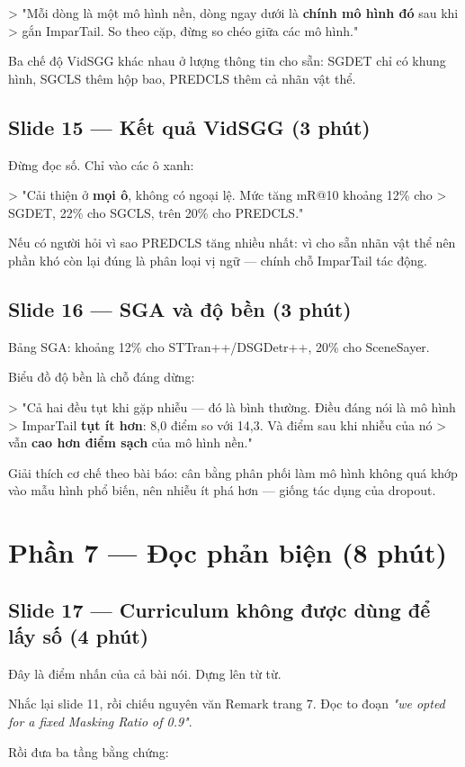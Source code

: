 \documentclass[11pt,a4paper]{article}
\begin{document}
> "Mỗi dòng là một mô hình nền, dòng ngay dưới là \textbf{chính mô hình đó} sau khi > gắn ImparTail. So theo cặp, đừng so chéo giữa các mô hình."

Ba chế độ VidSGG khác nhau ở lượng thông tin cho sẵn: SGDET chỉ có khung hình, SGCLS thêm hộp bao, PREDCLS thêm cả nhãn vật thể.

\subsection{Slide 15 --- Kết quả VidSGG (3 phút)}
Đừng đọc số. Chỉ vào các ô xanh:

> "Cải thiện ở \textbf{mọi ô}, không có ngoại lệ. Mức tăng mR@10 khoảng 12\% cho > SGDET, 22\% cho SGCLS, trên 20\% cho PREDCLS."

Nếu có người hỏi vì sao PREDCLS tăng nhiều nhất: vì cho sẵn nhãn vật thể nên phần khó còn lại đúng là phân loại vị ngữ --- chính chỗ ImparTail tác động.

\subsection{Slide 16 --- SGA và độ bền (3 phút)}
Bảng SGA: khoảng 12\% cho STTran++/DSGDetr++, 20\% cho SceneSayer.

Biểu đồ độ bền là chỗ đáng dừng:

> "Cả hai đều tụt khi gặp nhiễu --- đó là bình thường. Điều đáng nói là mô hình > ImparTail \textbf{tụt ít hơn}: 8,0 điểm so với 14,3. Và điểm sau khi nhiễu của nó > vẫn \textbf{cao hơn điểm sạch} của mô hình nền."

Giải thích cơ chế theo bài báo: cân bằng phân phối làm mô hình không quá khớp vào mẫu hình phổ biến, nên nhiễu ít phá hơn --- giống tác dụng của dropout.

\section{Phần 7 --- Đọc phản biện (8 phút)}
\subsection{Slide 17 --- Curriculum không được dùng để lấy số (4 phút)}
Đây là điểm nhấn của cả bài nói. Dựng lên từ từ.

Nhắc lại slide 11, rồi chiếu nguyên văn Remark trang 7. Đọc to đoạn \emph{"we opted for a fixed Masking Ratio of 0.9"}.

Rồi đưa ba tầng bằng chứng:
\end{document}
